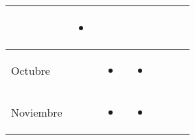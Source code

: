 \documentclass[landscape, a4paper, 10pt]{article}
\newcommand{\smallcellwidth}{0.7in}
\newcommand{\normalcellwidth}{1.2in}
\newcommand{\bigcellwidth}{2.0in}
\begin{document}
\begin{longtable}{|m{\smallcellwidth}|p{\normalcellwidth}|p{\bigcellwidth}|p{\bigcellwidth}|p{\normalcellwidth}|p{\normalcellwidth}|p{\normalcellwidth}|}
\begin{itemize}
		\end{itemize} &
		\begin{itemize}
			\item 
 		\end{itemize} &
		 &
		 &
		 \\
		\hline
		Octubre &
		 &
		\begin{itemize}
			\item 
		\end{itemize} &
		\begin{itemize}
			\item 
 		\end{itemize} &
		 &
		 &
		\\
		\hline
		Noviembre &
		 &
		\begin{itemize}
			\item 
		\end{itemize} &
		\begin{itemize}
			\item 
 		\end{itemize} &
		 &
		 &
		 \\
		\hline

	\end{longtable}
	\pagebreak[4]
\end{document}
